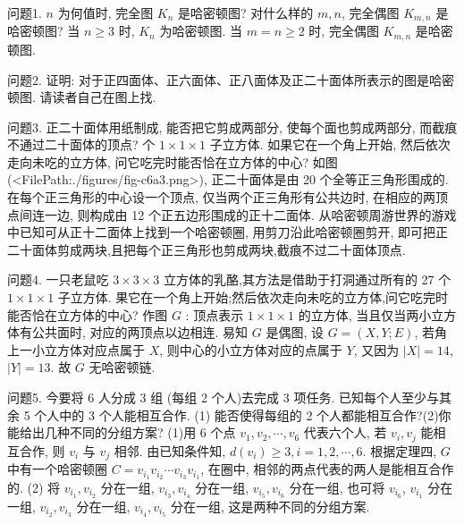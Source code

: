 
问题1. $n$ 为何值时, 完全图 $K_n$ 是哈密顿图? 对什么样的 $m, n$, 完全偶图 $K_{m, n}$ 是哈密顿图?
当 $n \geqslant 3$ 时, $K_n$ 为哈密顿图.
当 $m=n \geqslant 2$ 时, 完全偶图 $K_{m, n}$ 是哈密顿图.



问题2. 证明: 对于正四面体、正六面体、正八面体及正二十面体所表示的图是哈密顿图.
请读者自己在图上找.



问题3. 正二十面体用纸制成, 能否把它剪成两部分, 使每个面也剪成两部分, 而截痕不通过二十面体的顶点? 个 $1 \times 1 \times 1$ 子立方体.
如果它在一个角上开始, 然后依次走向未吃的立方体, 问它吃完时能否恰在立方体的中心?
如图(<FilePath:./figures/fig-c6a3.png>), 正二十面体是由 20 个全等正三角形围成的.
在每个正三角形的中心设一个顶点, 仅当两个正三角形有公共边时, 在相应的两顶点间连一边, 则构成由 12 个正五边形围成的正十二面体.
从哈密顿周游世界的游戏中已知可从正十二面体上找到一个哈密顿圈, 用剪刀沿此哈密顿圈剪开, 即可把正二十面体剪成两块,且把每个正三角形也剪成两块,截痕不过二十面体顶点.



问题4. 一只老鼠吃 $3\times 3\times 3$ 立方体的乳酪,其方法是借助于打洞通过所有的 27 个$1\times 1\times 1$ 子立方体.
果它在一个角上开始;然后依次走向未吃的立方体,问它吃完时能否恰在立方体的中心?
作图 $G$ : 顶点表示 $1 \times 1 \times 1$ 的立方体, 当且仅当两小立方体有公共面时, 对应的两顶点以边相连.
易知 $G$ 是偶图, 设 $G=(X, Y ; E)$, 若角上一小立方体对应点属于 $X$, 则中心的小立方体对应的点属于 $Y$, 又因为 $|X|=14$, $|Y|=13$. 故 $G$ 无哈密顿链.



问题5. 今要将 6 人分成 3 组 (每组 2 个人)去完成 3 项任务.
已知每个人至少与其余 5 个人中的 3 个人能相互合作.
(1) 能否使得每组的 2 个人都能相互合作?(2)你能给出几种不同的分组方案? 
(1)用 6 个点 $v_1, v_2, \cdots, v_6$ 代表六个人, 若 $v_i, v_j$ 能相互合作, 则 $v_i$ 与 $v_j$ 相邻.
由已知条件知, $d\left(v_i\right) \geqslant 3, i=1,2, \cdots, 6$. 根据定理四, $G$ 中有一个哈密顿圈 $C=v_{i_1} v_{i_2} \cdots v_{i_3} v_{i_1}$, 在圈中, 相邻的两点代表的两人是能相互合作的.
(2) 将 $v_{i_1}, v_{i_2}$ 分在一组, $v_{i_3}, v_{i_4}$ 分在一组, $v_{i_5}, v_{i_6}$ 分在一组, 也可将 $v_{i_6}$, $v_{i_1}$ 分在一组, $v_{i_2}, v_{i_3}$ 分在一组, $v_{i_4}, v_{i_5}$ 分在一组, 这是两种不同的分组方案.



